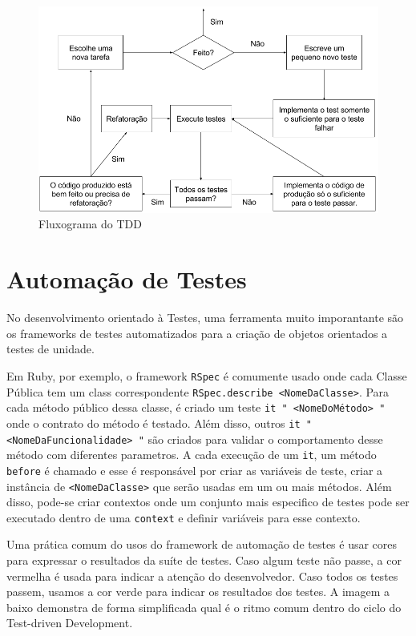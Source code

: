 \documentclass[12pt]{article}
\newcommand{\code}[1]{\texttt{#1}}
\begin{document}
  \begin{figure}[H]
    \centering
    \includegraphics[scale=0.4]{tdd}
    \caption{Fluxograma do TDD}
  \end{figure}

  \section{Automação de Testes}

  No desenvolvimento orientado à Testes, uma ferramenta muito imporantante são
  os frameworks de testes automatizados para a criação de objetos orientados
  a testes de unidade. 

  Em Ruby, por exemplo, o framework \code{RSpec} é comumente usado onde cada 
  Classe Pública tem um class correspondente 
  \code{RSpec.describe <NomeDaClasse>}. Para cada método público dessa classe, 
  é criado um teste \code{it " <NomeDoMétodo> "} onde o 
  contrato do método é testado. Além disso, outros 
  \code{it " <NomeDaFuncionalidade> "}
  são criados para validar o comportamento desse método com diferentes 
  parametros. A cada execução de um \code{it}, um método 
  \code{before} é chamado e esse é responsável por criar as variáveis de teste,
  criar a instância de \code{<NomeDaClasse>} que serão usadas em um ou mais 
  métodos. Além disso, pode-se criar contextos onde um conjunto mais especifico
  de testes pode ser executado dentro de uma \code{context} e definir variáveis
  para esse contexto.

  Uma prática comum do usos do framework de automação de testes é usar cores
  para expressar o resultados da suíte de testes. Caso algum teste não passe,
  a cor vermelha é usada para indicar a atenção do desenvolvedor. Caso todos os
  testes passem, usamos a cor verde para indicar os resultados dos testes. A 
  imagem a baixo demonstra de forma simplificada qual é o ritmo comum dentro do
  ciclo do Test-driven Development.
\end{document}
